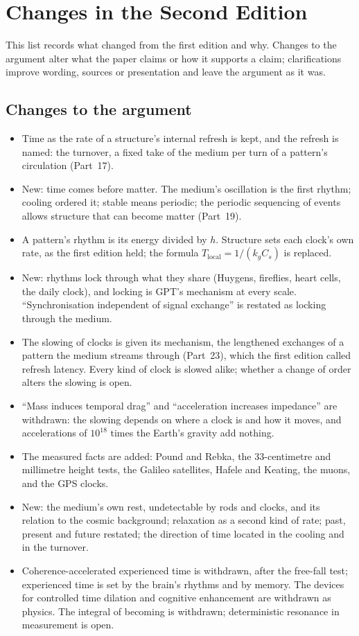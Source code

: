\documentclass[11pt,a4paper]{article}
\begin{document}
\clearpage
\section*{Changes in the Second Edition}

This list records what changed from the first edition and why. Changes to the argument alter what the paper claims or how it supports a claim; clarifications improve wording, sources or presentation and leave the argument as it was.

\subsection*{Changes to the argument}
\begin{itemize}
\item Time as the rate of a structure's internal refresh is kept, and the refresh is named: the turnover, a fixed take of the medium per turn of a pattern's circulation (Part~17).
\item New: time comes before matter. The medium's oscillation is the first rhythm; cooling ordered it; stable means periodic; the periodic sequencing of events allows structure that can become matter (Part~19).
\item A pattern's rhythm is its energy divided by $h$. Structure sets each clock's own rate, as the first edition held; the formula $T_{\text{local}} = 1/(k_g C_s)$ is replaced.
\item New: rhythms lock through what they share (Huygens, fireflies, heart cells, the daily clock), and locking is GPT's mechanism at every scale. ``Synchronisation independent of signal exchange'' is restated as locking through the medium.
\item The slowing of clocks is given its mechanism, the lengthened exchanges of a pattern the medium streams through (Part~23), which the first edition called refresh latency. Every kind of clock is slowed alike; whether a change of order alters the slowing is open.
\item ``Mass induces temporal drag'' and ``acceleration increases impedance'' are withdrawn: the slowing depends on where a clock is and how it moves, and accelerations of $10^{18}$ times the Earth's gravity add nothing.
\item The measured facts are added: Pound and Rebka, the 33-centimetre and millimetre height tests, the Galileo satellites, Hafele and Keating, the muons, and the GPS clocks.
\item New: the medium's own rest, undetectable by rods and clocks, and its relation to the cosmic background; relaxation as a second kind of rate; past, present and future restated; the direction of time located in the cooling and in the turnover.
\item Coherence-accelerated experienced time is withdrawn, after the free-fall test; experienced time is set by the brain's rhythms and by memory. The devices for controlled time dilation and cognitive enhancement are withdrawn as physics. The integral of becoming is withdrawn; deterministic resonance in measurement is open.
\end{itemize}
\end{document}
